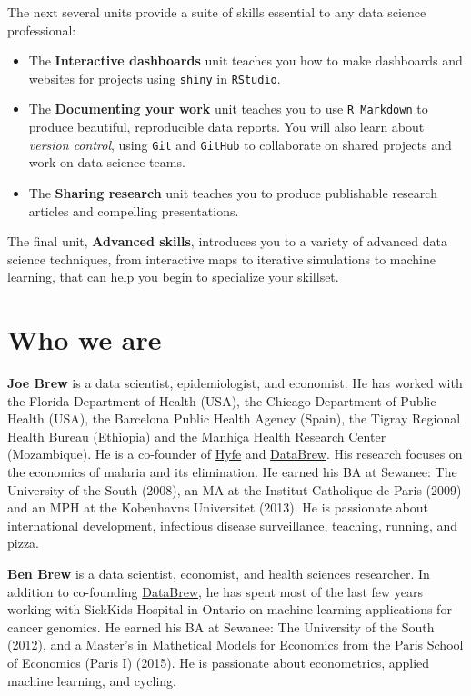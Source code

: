 \documentclass[
]{book}
\begin{document}
The next several units provide a suite of skills essential to any data science professional:

\begin{itemize}
\item
  The \textbf{Interactive dashboards} unit teaches you how to make dashboards and websites for projects using \texttt{shiny} in \texttt{RStudio}.
\item
  The \textbf{Documenting your work} unit teaches you to use \texttt{R\ Markdown} to produce beautiful, reproducible data reports. You will also learn about \emph{version control}, using \texttt{Git} and \texttt{GitHub} to collaborate on shared projects and work on data science teams.
\item
  The \textbf{Sharing research} unit teaches you to produce publishable research articles and compelling presentations.
\end{itemize}

The final unit, \textbf{Advanced skills}, introduces you to a variety of advanced data science techniques, from interactive maps to iterative simulations to machine learning, that can help you begin to specialize your skillset.

\hypertarget{who-we-are}{%
\section*{Who we are}\label{who-we-are}}

\textbf{Joe Brew} is a data scientist, epidemiologist, and economist. He has worked with the Florida Department of Health (USA), the Chicago Department of Public Health (USA), the Barcelona Public Health Agency (Spain), the Tigray Regional Health Bureau (Ethiopia) and the Manhiça Health Research Center (Mozambique). He is a co-founder of \href{www.hyfe.ai}{Hyfe} and \href{www.databrew.cc}{DataBrew}. His research focuses on the economics of malaria and its elimination. He earned his BA at Sewanee: The University of the South (2008), an MA at the Institut Catholique de Paris (2009) and an MPH at the Kobenhavns Universitet (2013). He is passionate about international development, infectious disease surveillance, teaching, running, and pizza.

\textbf{Ben Brew} is a data scientist, economist, and health sciences researcher. In addition to co-founding \href{www.databrew.cc}{DataBrew}, he has spent most of the last few years working with SickKids Hospital in Ontario on machine learning applications for cancer genomics. He earned his BA at Sewanee: The University of the South (2012), and a Master's in Mathetical Models for Economics from the Paris School of Economics (Paris I) (2015). He is passionate about econometrics, applied machine learning, and cycling.
\end{document}
